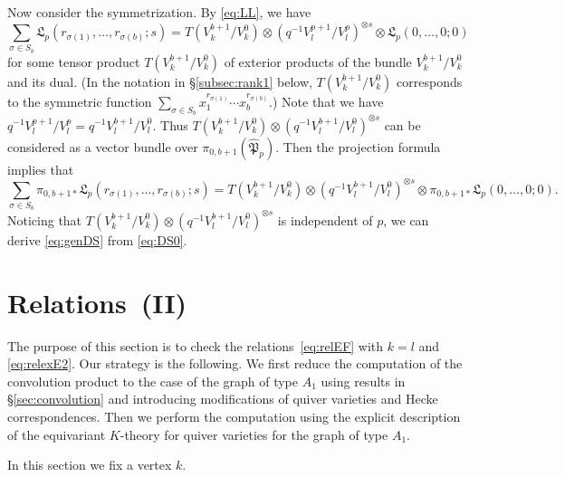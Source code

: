 \documentclass[12pt]{amsart}
\def\frak{\mathfrak}
\theoremstyle{definition}
\theoremstyle{remark}
\numberwithin{equation}{subsection}
\newcommand{\secref}[1]{\S\ref{#1}}
\newcommand{\subsecref}[1]{\S\ref{#1}}
\newcommand{\Pa}{{\frak P}} %
\begin{document}
Now consider the symmetrization.
By \eqref{eq:LL}, we have
\begin{equation*}
  \sum_{\sigma \in S_b}
   \mathfrak L_p(r_{\sigma(1)},\dots,r_{\sigma(b)};s)
   = T(V_k^{b+1}/V_k^0)\otimes
     \left(q^{-1} V^{p+1}_l/V^{p}_l \right)^{\otimes s}
     \otimes \mathfrak L_p(0,\dots,0;0)
\end{equation*}
for some tensor product $T(V_k^{b+1}/V_k^0)$ of
exterior products of the bundle $V_k^{b+1}/V_k^0$ and its dual.
(In the notation in \subsecref{subsec:rank1} below,
$T(V_k^{b+1}/V_k^0)$ corresponds to the symmetric function
$\sum_{\sigma\in S_b} x_1^{r_{\sigma(1)}}\cdots x_b^{r_{\sigma(b)}}$.)
Note that we have $q^{-1} V^{p+1}_l/V^{p}_l = q^{-1}
V^{b+1}_l/V^{0}_l$.
Thus
\(
   T(V_k^{b+1}/V_k^0)\otimes
     \left(q^{-1} V^{b+1}_l/V^{0}_l \right)^{\otimes s}
\)
can be considered as a vector bundle over $\pi_{0,b+1}(\widehat\Pa_p)$.
Then the projection formula implies that
\begin{equation*}
  \sum_{\sigma \in S_b} \pi_{0,b+1*}
   \mathfrak L_p(r_{\sigma(1)},\dots,r_{\sigma(b)};s)
   = T(V_k^{b+1}/V_k^0)\otimes
     \left(q^{-1} V^{b+1}_l/V^{0}_l \right)^{\otimes s}
     \otimes \pi_{0,b+1*}\mathfrak L_p(0,\dots,0;0).
\end{equation*}
Noticing that
\(
   T(V_k^{b+1}/V_k^0)\otimes
     \left(q^{-1} V^{b+1}_l/V^{0}_l \right)^{\otimes s}
\)
is independent of $p$, we can derive \eqref{eq:genDS} from \eqref{eq:DS0}.

\section{Relations~(II)}\label{sec:rel2}
The purpose of this section is to check the relations~\eqref{eq:relEF}
with $k = l$ and \eqref{eq:relexE2}.
%
Our strategy is the following.
We first reduce the computation of the convolution product to the case
of the graph of type $A_1$ using results in \secref{sec:convolution}
and introducing modifications of quiver varieties and Hecke
correspondences.
%
Then we perform the computation using the
explicit description of the equivariant $K$-theory for quiver
varieties for the graph of type $A_1$.

In this section we fix a vertex $k$.
\end{document}
